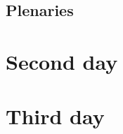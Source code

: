 \subsection{ Plenaries}

\clearpage

%

\clearpage
\section{Second day}

\clearpage
\section{Third day}


